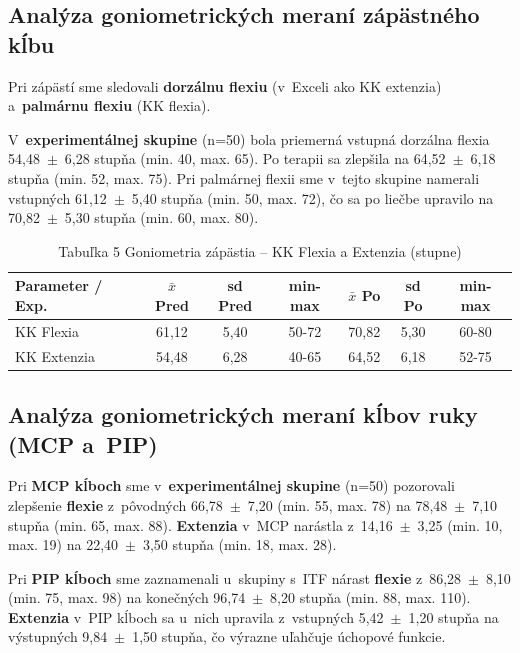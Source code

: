 \subsection{Analýza goniometrických meraní zápästného kĺbu}

Pri zápästí sme sledovali \textbf{dorzálnu flexiu} (v~Exceli ako KK extenzia) a~\textbf{palmárnu flexiu} (KK flexia). 

V~\textbf{experimentálnej skupine} (n=50) bola priemerná vstupná dorzálna flexia 54,48~$\pm$~6,28 stupňa (min. 40, max. 65). Po terapii sa zlepšila na 64,52~$\pm$~6,18 stupňa (min. 52, max. 75). Pri palmárnej flexii sme v~tejto skupine namerali vstupných 61,12~$\pm$~5,40 stupňa (min. 50, max. 72), čo sa po liečbe upravilo na 70,82~$\pm$~5,30 stupňa (min. 60, max. 80).

\begin{table}[H]
\centering
\caption*{Tabuľka 5 Goniometria zápästia – KK Flexia a Extenzia (stupne)}
\begin{tabular}{|l|c|c|c|c|c|c|}
\hline
\textbf{Parameter / Exp.} & \textbf{$\bar{x}$ Pred} & \textbf{sd Pred} & \textbf{min-max} & \textbf{$\bar{x}$ Po} & \textbf{sd Po} & \textbf{min-max} \\ \hline
KK Flexia & 61,12 & 5,40 & 50-72 & 70,82 & 5,30 & 60-80 \\ \hline
KK Extenzia & 54,48 & 6,28 & 40-65 & 64,52 & 6,18 & 52-75 \\ \hline
\end{tabular}
\end{table}

\subsection{Analýza goniometrických meraní kĺbov ruky (MCP a~PIP)}

Pri \textbf{MCP kĺboch} sme v~\textbf{experimentálnej skupine} (n=50) pozorovali zlepšenie \textbf{flexie} z~pôvodných 66,78~$\pm$~7,20 (min. 55, max. 78) na 78,48~$\pm$~7,10 stupňa (min. 65, max. 88). \textbf{Extenzia} v~MCP narástla z~14,16~$\pm$~3,25 (min. 10, max. 19) na 22,40~$\pm$~3,50 stupňa (min. 18, max. 28).

Pri \textbf{PIP kĺboch} sme zaznamenali u~skupiny s~ITF nárast \textbf{flexie} z~86,28~$\pm$~8,10 (min. 75, max. 98) na konečných 96,74~$\pm$~8,20 stupňa (min. 88, max. 110). \textbf{Extenzia} v~PIP kĺboch sa u~nich upravila z~vstupných 5,42~$\pm$~1,20 stupňa na výstupných 9,84~$\pm$~1,50 stupňa, čo výrazne uľahčuje úchopové funkcie.

